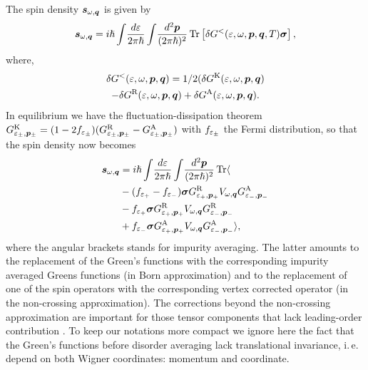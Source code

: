 The spin density $\boldsymbol{s}_{\omega,\boldsymbol{q}}$ is given by
\begin{equation}
    \boldsymbol{s}_{\omega,\boldsymbol{q}} = {i\hslash} \int\!\frac{d\varepsilon}{2\pi\hslash}\int\!\frac{d^2\boldsymbol{p}}{(2\pi\hslash)^2}\operatorname{Tr} \left[\delta G^<({\varepsilon,\omega,\boldsymbol{p},\boldsymbol{q}},T) \boldsymbol{\sigma}\right],
\end{equation}
where,
\begin{multline}
    \delta G^<(\varepsilon,\omega,\boldsymbol{p},\boldsymbol{q}) = 1/2 (\delta G^\text{K}(\varepsilon,\omega,\boldsymbol{p},\boldsymbol{q})\\-
    \delta G^\text{R}(\varepsilon,\omega,\boldsymbol{p},\boldsymbol{q})+\delta G^\text{A}(\varepsilon,\omega,\boldsymbol{p},\boldsymbol{q}).  
\end{multline}
In equilibrium we have the fluctuation-dissipation theorem $   G^\text{K}_{\varepsilon_\pm,\boldsymbol{p}_\pm} = (1-2f_{\varepsilon_\pm})(G^\text{R}_{\varepsilon_\pm,\boldsymbol{p}_\pm}-G^\text{A}_{\varepsilon_\pm,\boldsymbol{p}_\pm}) $ with $f_{\varepsilon_\pm}$ the Fermi distribution, so that the spin density now becomes
\begin{align}
    \boldsymbol{s}_{\omega,\boldsymbol{q}} &= {i\hslash} \int\!\frac{d\varepsilon}{2\pi\hslash}\int\!\frac{d^2\boldsymbol{p}}{(2\pi\hslash)^2}\operatorname{Tr}\langle\nonumber\\
    & -(f_{\varepsilon_+}-f_{\varepsilon_-})\boldsymbol{\sigma}G^\text{R}_{\varepsilon_+,\boldsymbol{p}_+} V_{\omega,\boldsymbol{q}}G^\text{A}_{\varepsilon_-,\boldsymbol{p}_-}\nonumber\\
    &-f_{\varepsilon_+}\boldsymbol{\sigma}G^\text{R}_{\varepsilon_+,\boldsymbol{p}_+} V_{\omega,\boldsymbol{q}}G^\text{R}_{\varepsilon_-,\boldsymbol{p}_-}\nonumber\\
    &+f_{\varepsilon_-}\boldsymbol{\sigma}G^\text{A}_{\varepsilon_+,\boldsymbol{p}_+} V_{\omega,\boldsymbol{q}}G^\text{A}_{\varepsilon_-,\boldsymbol{p}_-}\rangle,
\end{align}
where the angular brackets stands for impurity averaging. The latter amounts to the replacement of the Green's functions with the corresponding impurity averaged Greens functions (in Born approximation) and to the replacement of one of the spin operators with the corresponding vertex corrected operator (in the non-crossing approximation). The corrections beyond the non-crossing approximation are important for those tensor components that lack leading-order contribution \cite{ivanEPL}. To keep our notations more compact we ignore here the fact that the Green's functions before disorder averaging lack translational invariance, i.\,e. depend on both Wigner coordinates: momentum and coordinate. 

